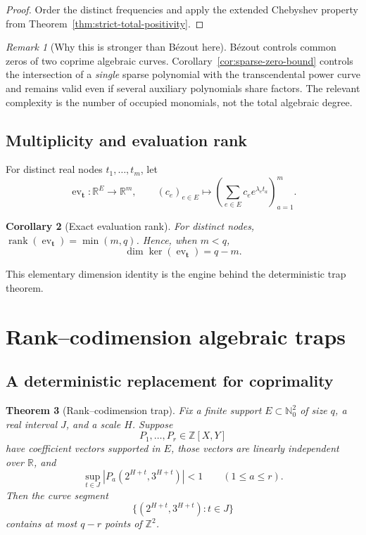 \documentclass[11pt,oneside]{article}
\newtheorem{theorem}{Theorem}[section]
\newtheorem{corollary}[theorem]{Corollary}
\theoremstyle{definition}
\theoremstyle{remark}
\newtheorem{remark}[theorem]{Remark}
\newcommand{\Nzero}{\mathbb N_0}
\newcommand{\Z}{\mathbb Z}
\newcommand{\R}{\mathbb R}
\newcommand{\rank}{\operatorname{rank}}
\begin{document}
\begin{proof}
Order the distinct frequencies and apply the extended Chebyshev property from
Theorem~\ref{thm:strict-total-positivity}.
\end{proof}

\begin{remark}[Why this is stronger than B\'ezout here]
B\'ezout controls common zeros of two coprime algebraic curves.  Corollary~\ref{cor:sparse-zero-bound}
controls the intersection of a \emph{single} sparse polynomial with the transcendental power
curve and remains valid even if several auxiliary polynomials share factors.  The relevant
complexity is the number of occupied monomials, not the total algebraic degree.
\end{remark}

\subsection{Multiplicity and evaluation rank}

For distinct real nodes $t_1,\ldots,t_m$, let
\[
 \operatorname{ev}_{\mathbf t}:\R^E\longrightarrow\R^m,
 \qquad
 (c_e)_{e\in E}\longmapsto
 \left(\sum_{e\in E}c_e e^{\lambda_e t_a}\right)_{a=1}^m.
\]

\begin{corollary}[Exact evaluation rank]
\label{cor:evaluation-rank}
For distinct nodes, $\rank(\operatorname{ev}_{\mathbf t})=\min(m,q)$.  Hence, when $m<q$,
\[
 \dim\ker(\operatorname{ev}_{\mathbf t})=q-m.
\]
\end{corollary}

This elementary dimension identity is the engine behind the deterministic trap theorem.

\section{Rank--codimension algebraic traps}
\label{sec:rank-codim}

\subsection{A deterministic replacement for coprimality}

\begin{theorem}[Rank--codimension trap]
\label{thm:rank-codim}
Fix a finite support $E\subset\Nzero^2$ of size $q$, a real interval $J$, and a scale $H$.
Suppose
\[
 P_1,\ldots,P_r\in\Z[X,Y]
\]
have coefficient vectors supported in $E$, those vectors are linearly independent over
$\R$, and
\begin{equation}
 \sup_{t\in J}|P_a(2^{H+t},3^{H+t})|<1
 \qquad(1\le a\le r).
 \label{eq:trap-shortness}
\end{equation}
Then the curve segment
\[
 \{(2^{H+t},3^{H+t}):t\in J\}
\]
contains at most $q-r$ points of $\Z^2$.
\end{theorem}
\end{document}
